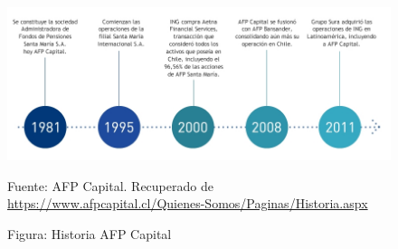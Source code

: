 \begin{figure}[H]
    \begin{minipage}[t]{0.9\textwidth}
        \caption{Figura: Historia AFP Capital}
        \label{historia-afp}        
    \end{minipage}

    \vspace{10pt}

    \begin{minipage}[b]{1.1\textwidth}
        \centering
        \includegraphics[width=\textwidth]{img/historia-afp-capital.jpg}        
    \end{minipage}

    \begin{minipage}[t]{0.9\textwidth}
        Fuente: AFP Capital. Recuperado de \url{https://www.afpcapital.cl/Quienes-Somos/Paginas/Historia.aspx}
    \end{minipage}
\end{figure}